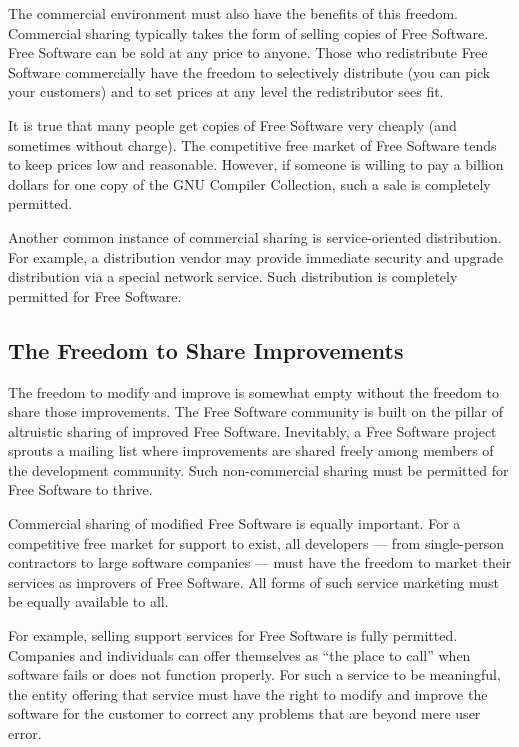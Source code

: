 \documentclass[12pt]{report}
\begin{document}
The commercial environment must also have the benefits of this freedom.
Commercial sharing typically takes the form of selling copies of Free
Software.  Free Software can be sold at any price to anyone.  Those who
redistribute Free Software commercially have the freedom to selectively
distribute (you can pick your customers) and to set prices at any level
the redistributor sees fit.

It is true that many people get copies of Free Software very cheaply (and
sometimes without charge). The competitive free market of Free Software
tends to keep prices low and reasonable.  However, if someone is willing
to pay a billion dollars for one copy of the GNU Compiler Collection, such
a sale is completely permitted.

Another common instance of commercial sharing is service-oriented
distribution.  For example, a distribution vendor may provide immediate
security and upgrade distribution via a special network service.  Such
distribution is completely permitted for Free Software.

\subsection{The Freedom to Share Improvements}

The freedom to modify and improve is somewhat empty without the freedom to
share those improvements.  The Free Software community is built on the
pillar of altruistic sharing of improved Free Software.  Inevitably, a
Free Software project sprouts a mailing list where improvements are shared
freely among members of the development community.  Such non-commercial
sharing must be permitted for Free Software to thrive.

Commercial sharing of modified Free Software is equally important.  For a
competitive free market for support to exist, all developers --- from
single-person contractors to large software companies --- must have the
freedom to market their services as improvers of Free Software.  All forms
of such service marketing must be equally available to all.

For example, selling support services for Free Software is fully
permitted.  Companies and individuals can offer themselves as ``the place
to call'' when software fails or does not function properly.  For such a
service to be meaningful, the entity offering that service must have the
right to modify and improve the software for the customer to correct any
problems that are beyond mere user error.
\end{document}
